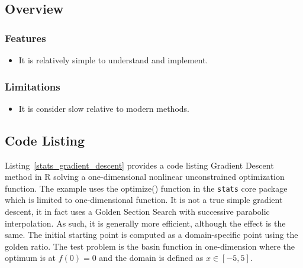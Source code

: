 \subsection{Overview}

\subsubsection{Features}

\begin{itemize}
	\item It is relatively simple to understand and implement.
\end{itemize}

\subsubsection{Limitations}

\begin{itemize}
	\item It is consider slow relative to modern methods.
\end{itemize}

\subsection{Code Listing}
Listing~\ref{stats_gradient_descent} provides a code listing Gradient Descent method in R solving a one-dimensional nonlinear unconstrained optimization function.
The example uses the {optimize()} function in the \texttt{stats} core package which is limited to one-dimensional function. It is not a true simple gradient descent, it in fact uses a Golden Section Search with successive parabolic interpolation. As such, it is generally more efficient, although the effect is the same. The initial starting point is computed as a domain-specific point using the golden ratio.
The test problem is the basin function in one-dimension where the optimum is at $f(0)=0$ and the domain is defined as $x \in [-5,5]$. 




